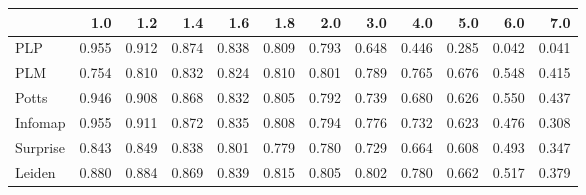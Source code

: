 \begin{tabular}{lrrrrrrrrrrr}
\toprule
{} &   1.0 &   1.2 &   1.4 &   1.6 &   1.8 &   2.0 &   3.0 &   4.0 &   5.0 &   6.0 &   7.0 \\
\midrule
PLP      & 0.955 & 0.912 & 0.874 & 0.838 & 0.809 & 0.793 & 0.648 & 0.446 & 0.285 & 0.042 & 0.041 \\
PLM      & 0.754 & 0.810 & 0.832 & 0.824 & 0.810 & 0.801 & 0.789 & 0.765 & 0.676 & 0.548 & 0.415 \\
Potts    & 0.946 & 0.908 & 0.868 & 0.832 & 0.805 & 0.792 & 0.739 & 0.680 & 0.626 & 0.550 & 0.437 \\
Infomap  & 0.955 & 0.911 & 0.872 & 0.835 & 0.808 & 0.794 & 0.776 & 0.732 & 0.623 & 0.476 & 0.308 \\
Surprise & 0.843 & 0.849 & 0.838 & 0.801 & 0.779 & 0.780 & 0.729 & 0.664 & 0.608 & 0.493 & 0.347 \\
Leiden   & 0.880 & 0.884 & 0.869 & 0.839 & 0.815 & 0.805 & 0.802 & 0.780 & 0.662 & 0.517 & 0.379 \\
\bottomrule
\end{tabular}

